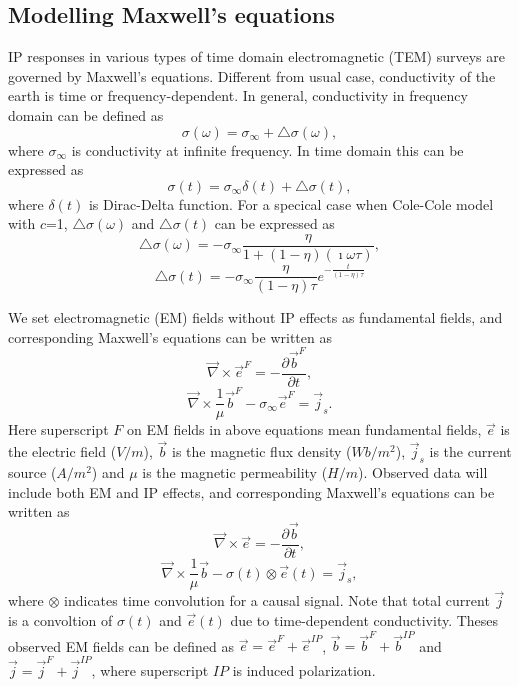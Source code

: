 \documentclass[letterpaper,11pt]{article}
\newcommand{\curl}{{\vec \nabla}\times}
\newcommand{\siginf}{\sigma_\infty}
\newcommand{\dsig}{\triangle\sigma}
\renewcommand {\j}  { {\vec j} }
\renewcommand {\b}  { {\vec b} }
\newcommand {\e}  { {\vec e} }
\begin{document}
\subsection{Modelling Maxwell's equations}
IP responses in various types of time domain electromagnetic (TEM) surveys are governed by Maxwell’s equations. Different from usual case, conductivity of the earth is time or frequency-dependent. In general, conductivity in frequency domain can be defined as 
\begin{equation}
  \sigma(\omega) = \siginf + \dsig(\omega),
  \label{eq:sigmaomega}
\end{equation}
where $\siginf$ is conductivity at infinite frequency.
In time domain this can be expressed as
\begin{equation}
  \sigma(t) = \siginf\delta(t) + \dsig(t),
  \label{eq:sigmat}
\end{equation}
where $\delta(t)$ is Dirac-Delta function. For a specical case when Cole-Cole model with $c$=1, $\dsig(\omega)$ and $\dsig(t)$ can be expressed as 
\begin{equation}
  \dsig(\omega)= -\sigma_{\infty}\frac{\eta}{1+(1-\eta)(\imath\omega\tau)},
\end{equation}
\begin{equation}
  \dsig(t)=-\siginf\frac{\eta}{(1-\eta)\tau}e^{-\frac{t}{(1-\eta)\tau}}  
\end{equation}

We set electromagnetic (EM) fields without IP effects as fundamental fields, and corresponding Maxwell’s equations can be written as 
\begin{equation}
  \curl \e^{F} = -\frac{\partial \b^{F}}{\partial t},
  \label{eq: eq_primary_farad}
\end{equation}
\begin{equation}
  \curl{\frac{1}{\mu}\b^{F}} -\siginf\e^{F} = \j_s.
  \label{eq: eq_primary_coulomb}
\end{equation}
Here superscript $F$ on EM fields in above equations mean fundamental fields, $\e$ is the electric field ($V/m$), $\b$ is the magnetic flux density ($Wb/m^2$), $\j_{s}$ is the current source ($A/m^2$) and $\mu$ is the magnetic permeability ($H/m$).
Observed data will include both EM and IP effects, and corresponding Maxwell’s equations can be written as
\begin{equation}
  \curl{\e} = -\frac{\partial \b}{\partial t},
  \label{eq: total_farad}
\end{equation}
\begin{equation}
  \curl{\frac{1}{\mu}\b} - \sigma(t)\otimes\e(t)= \j_{s},
  \label{eq: total_coulomb}
\end{equation}
where $\otimes$ indicates time convolution for a causal signal. Note that total current $\j$ is a convoltion of $\sigma(t)$ and $\e(t)$ due to time-dependent conductivity. 
Theses observed EM fields can be defined as $\e = \e^{F} + \e^{IP}$, $\b = \b^{F} + \b^{IP}$ and $\j = \j^{F} + \j^{IP}$, where superscript $IP$ is induced polarization. 
\end{document}
